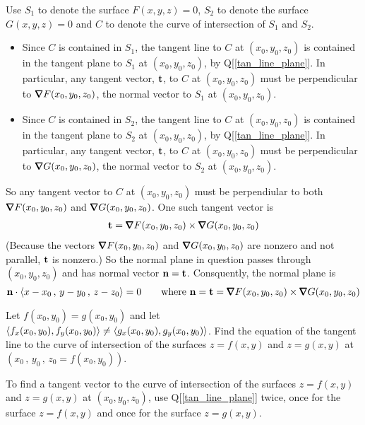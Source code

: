 \begin{solution}
Use $S_1$ to denote the surface $F(x,y,z)=0$, 
    $S_2$ to denote the surface $G(x,y,z)=0$ and 
    $C$ to denote the curve of intersection of $S_1$ and $S_2$.
\begin{itemize}
\item
Since $C$ is contained in $S_1$, the tangent line to $C$ at $(x_0,y_0,z_0)$
is contained in the tangent plane to $S_1$ at $(x_0,y_0,z_0)$, by 
Q[\ref{tan_line_plane}]. In particular, any tangent vector, $\mathbf{t}$, to 
$C$ at $(x_0,y_0,z_0)$ must be perpendicular to $\vnabla F(x_0,y_0,z_0)$,
the normal vector to $S_1$ at $(x_0,y_0,z_0)$.

\item
Since $C$ is contained in $S_2$, the tangent line to $C$ at $(x_0,y_0,z_0)$
is contained in the tangent plane to $S_2$ at $(x_0,y_0,z_0)$, by 
Q[\ref{tan_line_plane}]. In particular, any tangent vector, $\mathbf{t}$, to 
$C$ at $(x_0,y_0,z_0)$ must be perpendicular to $\vnabla G(x_0,y_0,z_0)$,
the normal vector to $S_2$ at $(x_0,y_0,z_0)$.
\end{itemize}
So any tangent vector to $C$ at $(x_0,y_0,z_0)$ must be perpendiular to both
$\vnabla F(x_0,y_0,z_0)$ and $\vnabla G(x_0,y_0,z_0)$.
One such tangent vector is
\begin{align*}
\vt = \vnabla F(x_0,y_0,z_0)\times \vnabla G(x_0,y_0,z_0)
\end{align*}
(Because the vectors $\vnabla F(x_0,y_0,z_0)$ and $\vnabla G(x_0,y_0,z_0)$
are nonzero and not parallel, $\mathbf{t}$ is nonzero.) So the normal plane in 
question passes through $(x_0,y_0,z_0)$ and has normal vector $\mathbf{n}=\mathbf{t}$.
Consquently, the normal plane is
\begin{equation*}
\vn\cdot\llt x-x_0\,,\,y-y_0\,,\,z-z_0\rgt =0 \qquad\text{where }
\vn=\vt=\vnabla F(x_0,y_0,z_0)\times \vnabla G(x_0,y_0,z_0)
\end{equation*}


\end{solution}


\begin{question}
Let $f(x_0,y_0)=g(x_0,y_0)$ and let 
$\left< f_x(x_0,y_0), f_y(x_0,y_0)\right>\ne \left< g_x(x_0,y_0), g_y(x_0,y_0)\right>$. Find the equation of the tangent line to the 
curve of intersection of the surfaces $z=f(x,y)$ and $z=g(x,y)$ at
$(x_0\,,\,y_0\,,\,z_0=f(x_0,y_0))$.
\end{question}

\begin{hint}
To find a tangent vector to the curve of intersection of the 
surfaces $z=f(x,y)$ and $z=g(x,y)$ at $(x_0,y_0,z_0)$,
use Q[\ref{tan_line_plane}] twice, once for the surface $z=f(x,y)$ and
once for the surface $z=g(x,y)$.
\end{hint}

